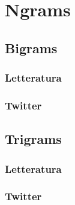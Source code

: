 \chapter{Ngrams}

\section{Bigrams}

\subsection{Letteratura}

\subsection{Twitter}

\section{Trigrams}

\subsection{Letteratura}

\subsection{Twitter}

